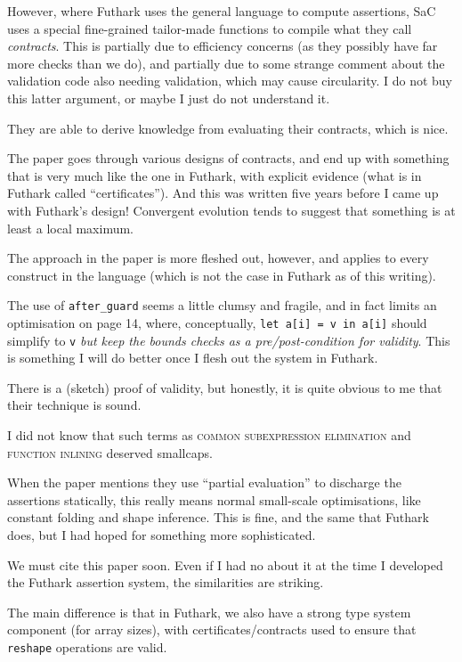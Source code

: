 \documentclass[a4paper, oneside, final]{memoir}
\begin{document}
However, where Futhark uses the general language to compute
assertions, SaC uses a special fine-grained tailor-made functions to
compile what they call \textit{contracts}.  This is partially due to
efficiency concerns (as they possibly have far more checks than we
do), and partially due to some strange comment about the validation
code also needing validation, which may cause circularity.  I do not
buy this latter argument, or maybe I just do not understand it.

They are able to derive knowledge from evaluating their contracts,
which is nice.

The paper goes through various designs of contracts, and end up with
something that is very much like the one in Futhark, with explicit
evidence (what is in Futhark called ``certificates'').  And this was
written five years before I came up with Futhark's design!  Convergent
evolution tends to suggest that something is at least a local maximum.

The approach in the paper is more fleshed out, however, and applies to
every construct in the language (which is not the case in Futhark as
of this writing).

The use of \texttt{after\_guard} seems a little clumsy and fragile,
and in fact limits an optimisation on page 14, where, conceptually,
\texttt{let a[i] = v in a[i]} should simplify to \texttt{v}
\textit{but keep the bounds checks as a pre/post-condition for
  validity}.  This is something I will do better once I flesh out the
system in Futhark.

There is a (sketch) proof of validity, but honestly, it is quite
obvious to me that their technique is sound.

I did not know that such terms as \textsc{common subexpression
  elimination} and \textsc{function inlining} deserved smallcaps.

When the paper mentions they use ``partial evaluation'' to discharge
the assertions statically, this really means normal small-scale
optimisations, like constant folding and shape inference.  This is
fine, and the same that Futhark does, but I had hoped for something
more sophisticated.

We must cite this paper soon.  Even if I had no about it at the time I
developed the Futhark assertion system, the similarities are striking.

The main difference is that in Futhark, we also have a strong type
system component (for array sizes), with certificates/contracts used
to ensure that \texttt{reshape} operations are valid.
\end{document}
